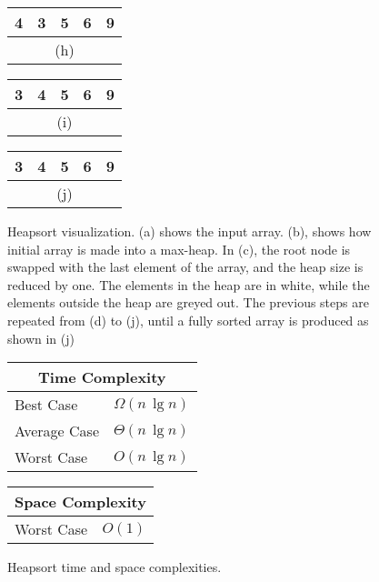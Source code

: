 \begin{figure}[!ht]
\begin{tabular}{|c|c|c|c|c|}
    \hline
    4 & 3 & \cellcolor{lightgray}5 & \cellcolor{lightgray}6 & \cellcolor{lightgray}9 \\
    \hline
    \multicolumn{5}{c}{(h)} \\
    \end{tabular}
    \break
    \begin{tabular}{|c|c|c|c|c|}
    \hline
    3 & \cellcolor{lightgray}4 & \cellcolor{lightgray}5 & \cellcolor{lightgray}6 & \cellcolor{lightgray}9 \\
    \hline
    \multicolumn{5}{c}{(i)} \\
    \end{tabular}
    \quad\quad\quad
    \begin{tabular}{|c|c|c|c|c|}
    \hline
    \cellcolor{lightgray}3 & \cellcolor{lightgray}4 & \cellcolor{lightgray}5 & \cellcolor{lightgray}6 & \cellcolor{lightgray}9 \\
    \hline
    \multicolumn{5}{c}{(j)} \\
    \end{tabular}
    
    \caption{Heapsort visualization. (a) shows the input array. (b),  shows how initial array is made into a max-heap. In (c), the root node is swapped with the last element of the array, and the heap size is reduced by one. The elements in the heap are in white, while the elements outside the heap are greyed out. The previous steps are repeated from (d) to (j), until a fully sorted array is produced as shown in (j)}
    \label{fig:heapsort_ex}
\end{figure}

\begin{figure}[!ht]
    \centering
    \begin{tabular}{l|l}
    \multicolumn{2}{c}{\textbf{Time Complexity}} \\
    \hline
    Best Case    & $\Omega(n \, \lg n)$ \\
    Average Case & $\Theta(n \, \lg n)$ \\
    Worst Case   & $O(n \, \lg n)$ \\
    \end{tabular}
    \quad\quad
    \begin{tabular}{l|l}
    \multicolumn{2}{c}{\textbf{Space Complexity}} \\
    \hline
    Worst Case   & $O(1)$
    \end{tabular}
    
    \caption{Heapsort time\cite{clrs2009} and space complexities\cite{big-o}.}
    \label{fig:heapsort}
\end{figure}

